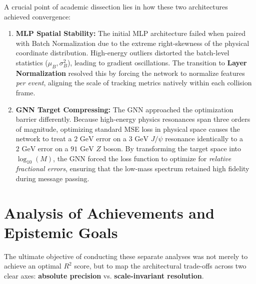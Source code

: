 \documentclass[11pt,a4paper,oneside]{article}
\begin{document}
A crucial point of academic dissection lies in how these two architectures achieved convergence:

\begin{enumerate}
    \item \textbf{MLP Spatial Stability:} The initial MLP architecture failed when paired with Batch Normalization due to the extreme right-skewness of the physical coordinate distribution. High-energy outliers distorted the batch-level statistics ($\mu_B, \sigma_B^2$), leading to gradient oscillations. The transition to \textbf{Layer Normalization} resolved this by forcing the network to normalize features \emph{per event}, aligning the scale of tracking metrics natively within each collision frame.
    \item \textbf{GNN Target Compressing:} The GNN approached the optimization barrier differently. Because high-energy physics resonances span three orders of magnitude, optimizing standard MSE loss in physical space causes the network to treat a $2\text{ GeV}$ error on a $3\text{ GeV}$ $J/\psi$ resonance identically to a $2\text{ GeV}$ error on a $91\text{ GeV}$ $Z$ boson. By transforming the target space into \textbf{$\log_{10}(M)$}, the GNN forced the loss function to optimize for \emph{relative fractional errors}, ensuring that the low-mass spectrum retained high fidelity during message passing.
\end{enumerate}

\section{Analysis of Achievements and Epistemic Goals}

The ultimate objective of conducting these separate analyses was not merely to achieve an optimal $R^2$ score, but to map the architectural trade-offs across two clear axes: \textbf{absolute precision} vs. \textbf{scale-invariant resolution}.
\end{document}
